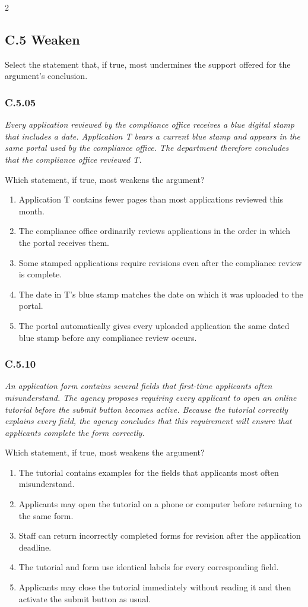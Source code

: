 \documentclass[10pt]{extarticle}
\newcommand{\choice}[1]{\item #1}
\newcommand{\bankitem}[1]{\subsubsection*{#1}}
\begin{document}
\begin{multicols}{2}
\subsection*{C.5 Weaken}
Select the statement that, if true, most undermines the support offered for the argument's conclusion.
\begin{samepage}
\bankitem{C.5.05}
\emph{Every application reviewed by the compliance office receives a blue digital stamp that includes a date. Application T bears a current blue stamp and appears in the same portal used by the compliance office. The department therefore concludes that the compliance office reviewed T.}

Which statement, if true, most weakens the argument?
\begin{enumerate}[label=(\alph*)]
  \choice{Application T contains fewer pages than most applications reviewed this month.}
  \choice{The compliance office ordinarily reviews applications in the order in which the portal receives them.}
  \choice{Some stamped applications require revisions even after the compliance review is complete.}
  \choice{The date in T's blue stamp matches the date on which it was uploaded to the portal.}
  \choice{The portal automatically gives every uploaded application the same dated blue stamp before any compliance review occurs.}
\end{enumerate}
\end{samepage}\par\smallskip
\begin{samepage}
\bankitem{C.5.10}
\emph{An application form contains several fields that first-time applicants often misunderstand. The agency proposes requiring every applicant to open an online tutorial before the submit button becomes active. Because the tutorial correctly explains every field, the agency concludes that this requirement will ensure that applicants complete the form correctly.}

Which statement, if true, most weakens the argument?
\begin{enumerate}[label=(\alph*)]
  \choice{The tutorial contains examples for the fields that applicants most often misunderstand.}
  \choice{Applicants may open the tutorial on a phone or computer before returning to the same form.}
  \choice{Staff can return incorrectly completed forms for revision after the application deadline.}
  \choice{The tutorial and form use identical labels for every corresponding field.}
  \choice{Applicants may close the tutorial immediately without reading it and then activate the submit button as usual.}
\end{enumerate}
\end{samepage}\par\smallskip

\end{multicols}
\end{document}
